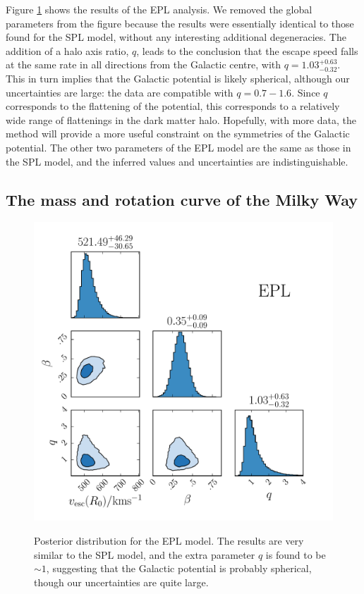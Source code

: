\documentclass[useAMS,twocolumn,usenatbib]{mn2e}
\begin{document}
Figure \ref{fig:EPL_posterior} shows the results of the EPL analysis. 
We removed the global parameters from the figure because the results were essentially identical to those found for the SPL model, without any interesting additional degeneracies. 
The addition of a halo axis ratio, $q$, leads to the conclusion that the escape speed falls at the same rate in all directions from the Galactic centre, with $q = 1.03^{+0.63}_{-0.32}$. 
This in turn implies that the Galactic potential is likely spherical, although our uncertainties are large: the data are compatible with $q=0.7 - 1.6$. 
Since $q$ corresponds to the flattening of the potential, this corresponds to a relatively wide range of flattenings in the dark matter halo. 
Hopefully, with more data, the method will provide a more useful constraint on the symmetries of the Galactic potential. 
The other two parameters of the EPL model are the same as those in the SPL model, and the inferred values and uncertainties are indistinguishable.

\subsection{The mass and rotation curve of the Milky Way}
\label{sec:mass}

\begin{figure}
\includegraphics[width=\columnwidth]{plots/corner_flattened_powerlaw}\\
\caption{Posterior distribution for the EPL model. 
The results are very similar to the SPL model, and the extra parameter $q$ is found to be $\sim 1$, suggesting that the Galactic potential is probably spherical, though our uncertainties are quite large.}
\label{fig:EPL_posterior}
\end{figure}
\end{document}
